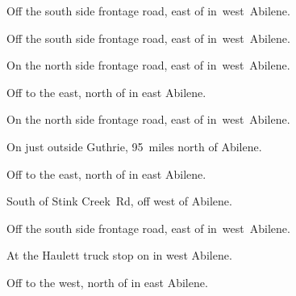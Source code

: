 
\begin{LocationList}

Off the south side  frontage road, east of  in~west~Abilene.

Off the south side  frontage road, east of  in~west~Abilene.

\Location{\GarageHQ \Garage}
On the north side  frontage road, east of  in~west~Abilene.

Off  to the east, north of  in east Abilene.

On the north side  frontage road, east of  in~west~Abilene.

On  just outside Guthrie, 95~miles north of Abilene.

Off  to the east, north of  in east Abilene.

South of Stink Creek~Rd, off   west of Abilene.

Off the south side  frontage road, east of  in~west~Abilene.

At the Haulett truck stop on  in west Abilene.

Off  to the west, north of  in east Abilene.

\end{LocationList}
